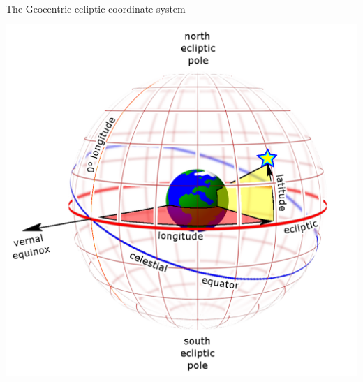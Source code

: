 \Tr
\onecolumn
\begin{center}
{\blue The Geocentric ecliptic coordinate system}\\[3mm]
\includegraphics[keepaspectratio,height=14cm]{ecliptic-coord}
\end{center}

